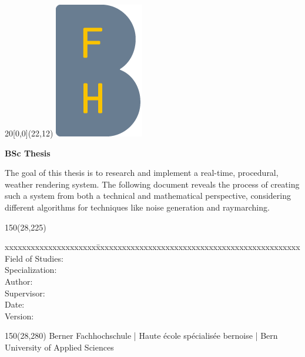 
\begin{titlepage}

\setlength{\unitlength}{1mm}

\begin{textblock}{20}[0,0](22,12)
    \includegraphics{../img/BFH_Logo_B.png}
\end{textblock}

\begin{flushleft}

\vspace*{21mm}

\fontsize{24.88pt}{40pt}\selectfont
\textbf{\doctitle}
\vspace{2mm}

\fontsize{17.28pt}{24pt}\selectfont\vspace{0.3em}
\docsubtitle
\vspace{6mm}

\fontsize{10pt}{12pt}\selectfont
\textbf{BSc Thesis}

\fontsize{10pt}{12pt}\selectfont
The goal of this thesis is to research and implement a real-time, \gls{procedural}, weather rendering system. The following document reveals the process of creating such a system from both a technical and mathematical perspective, considering different algorithms for techniques like noise generation and raymarching.
\begin{textblock}{150}(28,225)
\fontsize{10pt}{17pt}
\begin{tabbing}
xxxxxxxxxxxxxxxxxxxxx\=xxxxxxxxxxxxxxxxxxxxxxxxxxxxxxxxxxxxxxxxxxxxxxx \kill
Field of Studies:	\> \fieldofstudies	\\
Specialization:	    \> \specialisation	\\
Author:		        \> \docauthor \\
Supervisor:         \> \prof \\
Date:			    \> \versiondate \\
Version:		     \\
\end{tabbing}

\end{textblock}

\begin{textblock}{150}(28,280)
\noindent 
\color{bfhgrey}\fontsize{9pt}{10pt}\selectfont
Berner Fachhochschule | Haute \'ecole sp\'ecialis\'ee bernoise | Bern University of Applied Sciences
\color{black}\selectfont
\end{textblock}

\end{flushleft}

\end{titlepage}